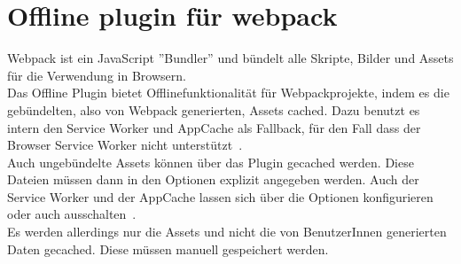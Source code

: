 \section{Offline plugin für webpack}
Webpack ist ein JavaScript ''Bundler'' und bündelt alle Skripte, Bilder und \gls{Assets} für die Verwendung in Browsern.\\
Das Offline Plugin bietet Offlinefunktionalität für Webpackprojekte, indem es die gebündelten, also von Webpack generierten, \gls{Assets} cached.
Dazu benutzt es intern den Service Worker und AppCache als Fallback, für den Fall dass der Browser Service Worker nicht unterstützt~\cite{webpack-gh}.\\
Auch ungebündelte \gls{Assets} können über das Plugin gecached werden. Diese Dateien müssen dann in den Optionen explizit angegeben werden. Auch der Service Worker und der AppCache lassen sich über die Optionen konfigurieren oder auch ausschalten~\cite{webpack-opt}.\\
Es werden allerdings nur die \gls{Assets} und nicht die von BenutzerInnen generierten Daten gecached. Diese müssen manuell gespeichert werden.